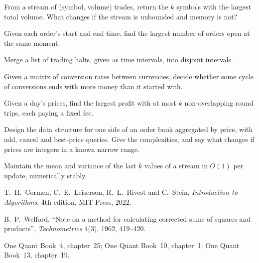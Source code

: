 \begin{interviewq}\label{iq:iv:algorithms-and-data-structures:8}
From a stream of (symbol, volume) trades, return the $k$ symbols with the largest total volume. What changes if the stream is
unbounded and memory is not?
\end{interviewq}

\begin{interviewq}\label{iq:iv:algorithms-and-data-structures:9}
Given each order's start and end time, find the largest number of orders open at the same moment.
\end{interviewq}

\begin{interviewq}\label{iq:iv:algorithms-and-data-structures:10}
Merge a list of trading halts, given as time intervals, into disjoint intervals.
\end{interviewq}

\begin{interviewq}\label{iq:iv:algorithms-and-data-structures:11}
Given a matrix of conversion rates between currencies, decide whether some cycle of conversions ends with more money than it
started with.
\end{interviewq}

\begin{interviewq}\label{iq:iv:algorithms-and-data-structures:12}
Given a day's prices, find the largest profit with at most $k$ non-overlapping round trips, each paying a fixed fee.
\end{interviewq}

\begin{interviewq}\label{iq:iv:algorithms-and-data-structures:13}
Design the data structure for one side of an order book aggregated by price, with add, cancel and best-price queries. Give the
complexities, and say what changes if prices are integers in a known narrow range.
\end{interviewq}

\begin{interviewq}\label{iq:iv:algorithms-and-data-structures:14}
Maintain the mean and variance of the last $k$ values of a stream in $O(1)$ per update, numerically stably.
\end{interviewq}

\begin{omsources}
\item T.~H.~Cormen, C.~E.~Leiserson, R.~L.~Rivest and C.~Stein, \emph{Introduction to Algorithms}, 4th edition, MIT Press,
2022.
\item B.~P.~Welford, ``Note on a method for calculating corrected sums of squares and products'', \emph{Technometrics} 4(3),
1962, 419--420.
\item One Quant Book~4, chapter~25; One Quant Book~10, chapter~1; One Quant Book~13, chapter~19.
\end{omsources}
